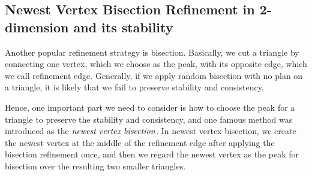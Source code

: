     \subsection{Newest Vertex Bisection Refinement in 2-dimension and its stability}
    Another popular refinement strategy is bisection. Basically, we cut a triangle by connecting one vertex, which we choose as the peak, with its opposite edge, which we call refinement edge. Generally, if we apply random bisection with no plan on a triangle, it is likely that we fail to preserve stability and consistency.

    Hence, one important part we need to consider is how to choose the peak for a triangle to preserve the stability and consistency, and one famous method was introduced as the $\emph{newest vertex bisection}$. In newest vertex bisection, we create the newest vertex at the middle of the refinement edge after applying the bisection refinement once, and then we regard the newest vertex as the peak for bisection over the resulting two smaller triangles.

